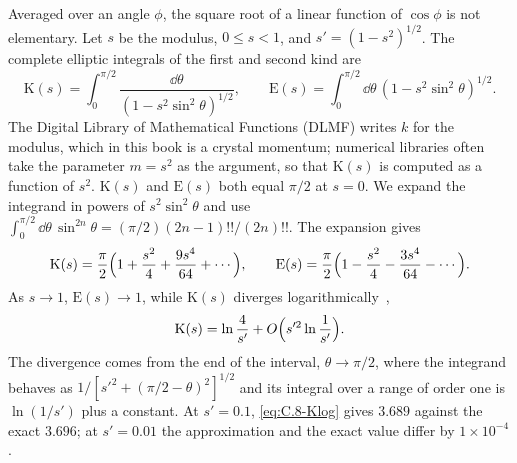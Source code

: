 Averaged over an angle $\phi$, the square root of a linear function of $\cos\phi$ is not elementary. Let $s$ be the modulus, $0 \le s < 1$, and $s' = (1 - s^2)^{1/2}$. The complete elliptic integrals of the first and second kind are~\cite[Eq.~(19.2.8)]{olver2010nist}
\begin{equation}
  \mathrm{K}(s) = \int_0^{\pi/2}\frac{\dd\theta}{(1 - s^2\sin^2\theta)^{1/2}}, \qquad
  \mathrm{E}(s) = \int_0^{\pi/2}\dd\theta\,(1 - s^2\sin^2\theta)^{1/2} .
  \label{eq:C.8-KE}
\end{equation}
The Digital Library of Mathematical Functions (DLMF) writes $k$ for the modulus, which in this book is a crystal momentum; numerical libraries often take the parameter $m = s^2$ as the argument, so that $\mathrm{K}(s)$ is computed as a function of $s^2$. $\mathrm{K}(s)$ and $\mathrm{E}(s)$ both equal $\pi/2$ at $s = 0$. We expand the integrand in powers of $s^2\sin^2\theta$ and use $\int_0^{\pi/2}\dd\theta\,\sin^{2n}\theta = (\pi/2)(2n - 1)!!/(2n)!!$. The expansion gives~\cite[Eqs.~(19.5.1) and (19.5.2)]{olver2010nist}
\begin{equation}
  \mathrm{K}(s) = \frac\pi2\Bigl(1 + \frac{s^2}{4} + \frac{9s^4}{64} + \cdots\Bigr), \qquad
  \mathrm{E}(s) = \frac\pi2\Bigl(1 - \frac{s^2}{4} - \frac{3s^4}{64} - \cdots\Bigr) .
  \label{eq:C.8-KEseries}
\end{equation}
As $s \to 1$, $\mathrm{E}(s) \to 1$, while $\mathrm{K}(s)$ diverges logarithmically~\cite[Eq.~(19.12.1)]{olver2010nist},
\begin{equation}
  \mathrm{K}(s) = \ln\frac{4}{s'} + O\Bigl(s'^2\ln\frac{1}{s'}\Bigr) .
  \label{eq:C.8-Klog}
\end{equation}
The divergence comes from the end of the interval, $\theta \to \pi/2$, where the integrand behaves as $1/[s'^2 + (\pi/2 - \theta)^2]^{1/2}$ and its integral over a range of order one is $\ln(1/s')$ plus a constant. At $s' = 0.1$, \cref{eq:C.8-Klog} gives $3.689$ against the exact $3.696$; at $s' = 0.01$ the approximation and the exact value differ by $1\times10^{-4}$.

